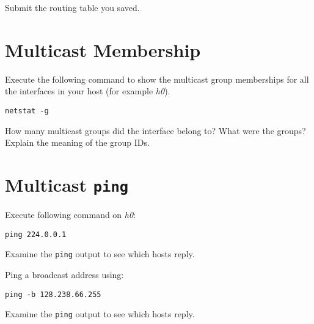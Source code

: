 \documentclass{../UTNetLab}
\begin{document}
    \begin{report}
        \item Submit the routing table you saved.
    \end{report}

\section{Multicast Membership}
    Execute the following command to show the multicast group memberships for all the interfaces in your host (for example \textit{h0}).

    \begin{lstlisting}
netstat -g
    \end{lstlisting}
    
    \begin{report}
        \item How many multicast groups did the interface belong to? What were the groups? Explain the meaning of the group IDs.
    \end{report}

\section{Multicast \texttt{ping}}

    Execute following command on \textit{h0}:

    \begin{lstlisting}
ping 224.0.0.1
    \end{lstlisting}
    Examine the \lstinline{ping} output to see which hosts reply.

    Ping a broadcast address using:

    \begin{lstlisting}
ping -b 128.238.66.255
    \end{lstlisting}
    Examine the \lstinline{ping} output to see which hosts reply.
\end{document}
